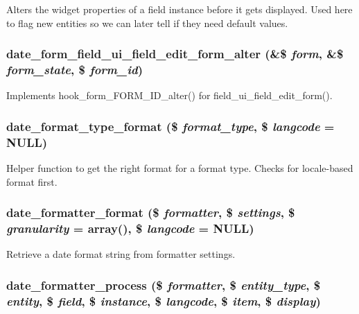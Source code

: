 Alters the widget properties of a field instance before it gets displayed. Used here to flag new entities so we can later tell if they need default values. \hypertarget{date_8module_aa03c845a994be25b8d52c0ed091deebc}{
\subsubsection[{date\_\-form\_\-field\_\-ui\_\-field\_\-edit\_\-form\_\-alter}]{\setlength{\rightskip}{0pt plus 5cm}date\_\-form\_\-field\_\-ui\_\-field\_\-edit\_\-form\_\-alter (\&\$ {\em form}, \/  \&\$ {\em form\_\-state}, \/  \$ {\em form\_\-id})}}
\label{date_8module_aa03c845a994be25b8d52c0ed091deebc}
Implements hook\_\-form\_\-FORM\_\-ID\_\-alter() for field\_\-ui\_\-field\_\-edit\_\-form(). \hypertarget{date_8module_a312afe2762238ca96afc11ea85b88dfd}{
\subsubsection[{date\_\-format\_\-type\_\-format}]{\setlength{\rightskip}{0pt plus 5cm}date\_\-format\_\-type\_\-format (\$ {\em format\_\-type}, \/  \$ {\em langcode} = {\ttfamily NULL})}}
\label{date_8module_a312afe2762238ca96afc11ea85b88dfd}
Helper function to get the right format for a format type. Checks for locale-\/based format first. \hypertarget{date_8module_a1fc73aa4ebc3a08f155eec42918f32c6}{
\subsubsection[{date\_\-formatter\_\-format}]{\setlength{\rightskip}{0pt plus 5cm}date\_\-formatter\_\-format (\$ {\em formatter}, \/  \$ {\em settings}, \/  \$ {\em granularity} = {\ttfamily array()}, \/  \$ {\em langcode} = {\ttfamily NULL})}}
\label{date_8module_a1fc73aa4ebc3a08f155eec42918f32c6}
Retrieve a date format string from formatter settings. \hypertarget{date_8module_a4b019297d5d8f388aa2252ad62b3bfde}{
\subsubsection[{date\_\-formatter\_\-process}]{\setlength{\rightskip}{0pt plus 5cm}date\_\-formatter\_\-process (\$ {\em formatter}, \/  \$ {\em entity\_\-type}, \/  \$ {\em entity}, \/  \$ {\em field}, \/  \$ {\em instance}, \/  \$ {\em langcode}, \/  \$ {\em item}, \/  \$ {\em display})}}
